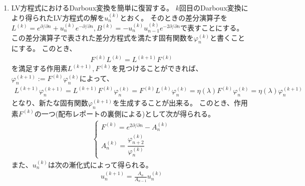 \documentclass{jsarticle}
\begin{document}
\begin{enumerate}
\item 
LV方程式におけるDarboux変換を簡単に復習する。
$k$回目のDarboux変換により得られたLV方程式の解を$u^{(k)}_{n}$とおく。
そのときの差分演算子を$L^{(k)}=e^{\partial/\partial n}+u^{(k)}_{n}e^{-\partial/\partial n},
B^{(k)}=-u_{n}^{(k)}u_{n-1}^{(k)}e^{-2\partial/\partial n}$で表すことにする。
この差分演算子で表された差分方程式を満たす固有関数を$\varphi_{n}^{(k)}$と書くことにする。
このとき、
\begin{align}
F^{(k)}L^{(k)}=L^{(k+1)}F^{(k)}
\end{align}
を満足する作用素$L^{(k+1)},F^{(k)}$を見つけることができれば、
$\varphi_{n}^{(k+1)}:=F^{(k)}\varphi_{n}^{(k)}$によって、
\begin{align}
L^{(k+1)}\varphi_{n}^{(k+1)}=L^{(k+1)}F^{(k)}\varphi_{n}^{(k)}
=F^{(k)}L^{(k)}\varphi_{n}^{(k)}=\eta(\lambda)F^{(k)}\varphi_{n}^{(k)}
=\eta(\lambda)\varphi_{n}^{(k+1)}
\end{align}
となり、新たな固有関数$\varphi_{n}^{(k+1)}$を生成することが出来る。
このとき、作用素$F^{(k)}$の一つ(配布レポートの裏側による)として次が得られる。
\begin{align}
\left\{
\begin{array}{l}
F^{(k)}=e^{2\partial/\partial n}-A_{n}^{(k)}\\
A_{n}^{(k)}=\dfrac{\varphi_{n+2}^{(k)}}{\varphi_{n}^{(k)}}
\end{array}
\right.
\end{align}
また、$u_{n}^{(k)}$は次の漸化式によって得られる。
\begin{align}
u_{n}^{(k+1)}=\frac{A_{n}}{A_{n-1}}u_{n}^{(k)}
\end{align}


\end{enumerate}
\end{document}
